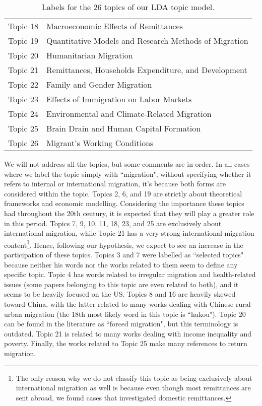 \begin{table}[]
\begin{tabular}{@{}cl@{}}
Topic 18        & Macroeconomic Effects of Remittances                     \\
Topic 19        & Quantitative Models and Research Methods of Migration    \\
Topic 20        & Humanitarian Migration                                   \\
Topic 21        & Remittances, Households Expenditure, and Development     \\
Topic 22        & Family and Gender Migration                              \\
Topic 23        & Effects of Immigration on Labor Markets                  \\
Topic 24        & Environmental and Climate-Related Migration              \\
Topic 25        & Brain Drain and Human Capital Formation                  \\
Topic 26        & Migrant's Working Conditions                             \\ \bottomrule
\end{tabular}
\caption{Labels for the 26 topics of our LDA topic model.}
\label{tab:topics_labels}
\end{table}

We will not address all the topics, but some comments are in order. In all cases where we label the topic simply with ``migration", without specifying whether it refers to internal or international migration, it's because both forms are considered within the topic. Topics 2, 6, and 19 are strictly about theoretical frameworks and economic modelling. Considering the importance these topics had throughout the 20th century, it is expected that they will play a greater role in this period. Topics 7, 9, 10, 11, 18, 23, and 25 are exclusively about international migration, while Topic 21 has a very strong international migration content\footnote{The only reason why we do not classify this topic as being exclusively about international migration as well is because even though most remittances are sent abroad, we found cases that investigated domestic remittances.}. Hence, following our hypothesis, we expect to see an increase in the participation of these topics. Topics 3 and 7 were labelled as ``selected topics" because neither his words nor the works related to them seem to define any specific topic. Topic 4 has words related to irregular migration and health-related issues (some papers belonging to this topic are even related to both), and it seems to be heavily focused on the US. Topics 8 and 16 are heavily skewed toward China, with the latter related to many works dealing with Chinese rural-urban migration (the 18th most likely word in this topic is ``hukou"). Topic 20 can be found in the literature as ``forced migration", but this terminology is outdated. Topic 21 is related to many works dealing with income inequality and poverty. Finally, the works related to Topic 25 make many references to return migration.

